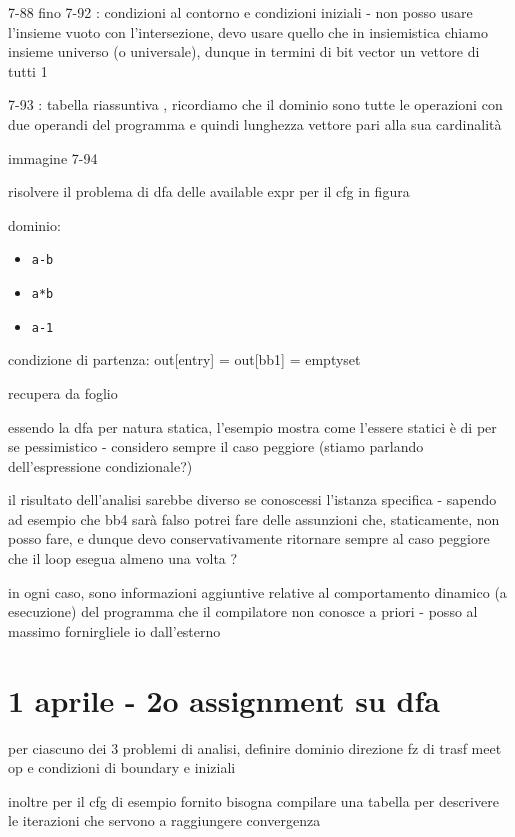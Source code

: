 7-88 fino 7-92 : condizioni al contorno e condizioni iniziali - non posso usare l'insieme vuoto con l'intersezione, devo usare quello che in insiemistica chiamo insieme universo (o universale), dunque in termini di bit vector un vettore di tutti 1

7-93 : tabella riassuntiva , ricordiamo che il dominio sono tutte le operazioni con due operandi del programma e quindi lunghezza vettore pari alla sua cardinalit\`a

\begin{example}
    immagine 7-94

    risolvere il problema di dfa delle available expr per il cfg in figura

    dominio:
    \begin{itemize}
      \item \lstinline|a-b|
      \item \lstinline|a*b|
      \item \lstinline|a-1|
    \end{itemize}
    
    condizione di partenza: out[entry] = out[bb1] = emptyset

    recupera da foglio

\end{example}

essendo la dfa per natura statica, l'esempio mostra come l'essere statici \`e di per se pessimistico - considero sempre il caso peggiore (stiamo parlando dell'espressione condizionale?)

il risultato dell'analisi sarebbe diverso se conoscessi l'istanza specifica - sapendo ad esempio che bb4 sar\`a falso potrei fare delle assunzioni che, staticamente, non posso fare, e dunque devo conservativamente ritornare sempre al caso peggiore che il loop esegua almeno una volta ?

in ogni caso, sono informazioni aggiuntive relative al comportamento dinamico (a esecuzione) del programma che il compilatore non conosce a priori - posso al massimo fornirgliele io dall'esterno

\section{1 aprile - 2o assignment su dfa}

per ciascuno dei 3 problemi di analisi, definire dominio direzione fz di trasf meet op e condizioni di boundary e iniziali

inoltre per il cfg di esempio fornito bisogna compilare una tabella per descrivere le iterazioni che servono a raggiungere convergenza

